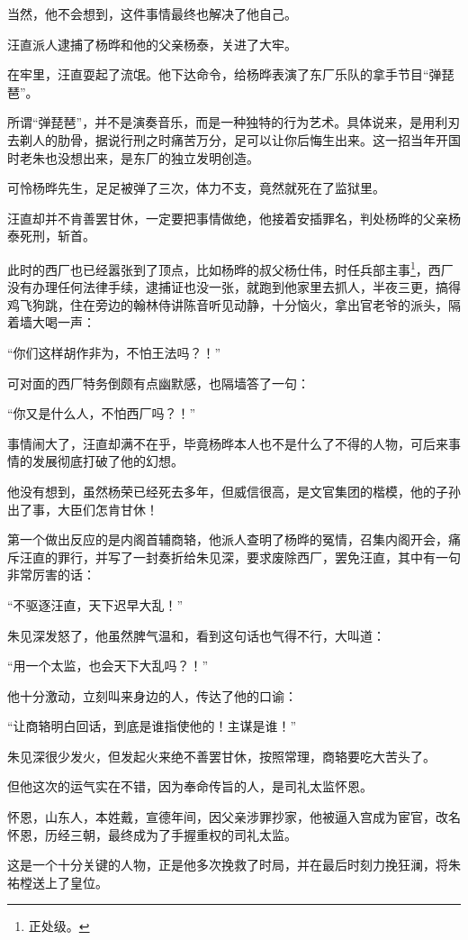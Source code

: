 \begin{multicols}{\theparacolNo}
		当然，他不会想到，这件事情最终也解决了他自己。

		汪直派人逮捕了杨晔和他的父亲杨泰，关进了大牢。

		在牢里，汪直耍起了流氓。他下达命令，给杨晔表演了东厂乐队的拿手节目“弹琵琶”。

		所谓“弹琵琶”，并不是演奏音乐，而是一种独特的行为艺术。具体说来，是用利刃去剃人的肋骨，据说行刑之时痛苦万分，足可以让你后悔生出来。这一招当年开国时老朱也没想出来，是东厂的独立发明创造。

		可怜杨晔先生，足足被弹了三次，体力不支，竟然就死在了监狱里。

		汪直却并不肯善罢甘休，一定要把事情做绝，他接着安插罪名，判处杨晔的父亲杨泰死刑，斩首。

		此时的西厂也已经嚣张到了顶点，比如杨晔的叔父杨仕伟，时任兵部主事\footnote{正处级。}，西厂没有办理任何法律手续，逮捕证也没一张，就跑到他家里去抓人，半夜三更，搞得鸡飞狗跳，住在旁边的翰林侍讲陈音听见动静，十分恼火，拿出官老爷的派头，隔着墙大喝一声：

		“你们这样胡作非为，不怕王法吗？！”

		可对面的西厂特务倒颇有点幽默感，也隔墙答了一句：

		“你又是什么人，不怕西厂吗？！”

		事情闹大了，汪直却满不在乎，毕竟杨晔本人也不是什么了不得的人物，可后来事情的发展彻底打破了他的幻想。

		他没有想到，虽然杨荣已经死去多年，但威信很高，是文官集团的楷模，他的子孙出了事，大臣们怎肯甘休！

		第一个做出反应的是内阁首辅商辂，他派人查明了杨晔的冤情，召集内阁开会，痛斥汪直的罪行，并写了一封奏折给朱见深，要求废除西厂，罢免汪直，其中有一句非常厉害的话：

		“不驱逐汪直，天下迟早大乱！”

		朱见深发怒了，他虽然脾气温和，看到这句话也气得不行，大叫道：

		“用一个太监，也会天下大乱吗？！”

		他十分激动，立刻叫来身边的人，传达了他的口谕：

		“让商辂明白回话，到底是谁指使他的！主谋是谁！”

		朱见深很少发火，但发起火来绝不善罢甘休，按照常理，商辂要吃大苦头了。

		但他这次的运气实在不错，因为奉命传旨的人，是司礼太监怀恩。

		怀恩，山东人，本姓戴，宣德年间，因父亲涉罪抄家，他被逼入宫成为宦官，改名怀恩，历经三朝，最终成为了手握重权的司礼太监。

		这是一个十分关键的人物，正是他多次挽救了时局，并在最后时刻力挽狂澜，将朱祐樘送上了皇位。


\end{multicols}
